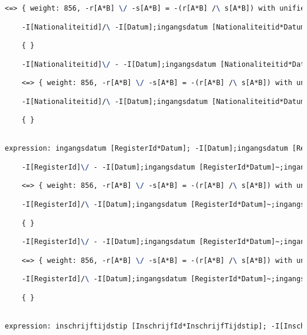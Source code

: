 \begin{lstlisting}[language=TeX]
    <=> { weight: 856, -r[A*B] \/ -s[A*B] = -(r[A*B] /\ s[A*B]) with unifier: {A->I[Nationaliteitid], B->I[Nationaliteitid], r->ingangsdatum [Nationaliteitid*Datum];-I[Datum];ingangsdatum [Nationaliteitid*Datum]~, s->I[Nationaliteitid]} }

    -I[Nationaliteitid]/\ -I[Datum];ingangsdatum [Nationaliteitid*Datum]~;ingangsdatum [Nationaliteitid*Datum]

    { }

    -I[Nationaliteitid]\/ - -I[Datum];ingangsdatum [Nationaliteitid*Datum]~;ingangsdatum [Nationaliteitid*Datum]

    <=> { weight: 856, -r[A*B] \/ -s[A*B] = -(r[A*B] /\ s[A*B]) with unifier: {A->I[Nationaliteitid], B->I[Nationaliteitid], r->I[Nationaliteitid], s->ingangsdatum [Nationaliteitid*Datum];-I[Datum];ingangsdatum [Nationaliteitid*Datum]~} }

    -I[Nationaliteitid]/\ -I[Datum];ingangsdatum [Nationaliteitid*Datum]~;ingangsdatum [Nationaliteitid*Datum]

    { }


expression: ingangsdatum [RegisterId*Datum]; -I[Datum];ingangsdatum [RegisterId*Datum]~ |- -I[RegisterId]

    -I[RegisterId]\/ - -I[Datum];ingangsdatum [RegisterId*Datum]~;ingangsdatum [RegisterId*Datum]

    <=> { weight: 856, -r[A*B] \/ -s[A*B] = -(r[A*B] /\ s[A*B]) with unifier: {A->I[RegisterId], B->I[RegisterId], r->ingangsdatum [RegisterId*Datum];-I[Datum];ingangsdatum [RegisterId*Datum]~, s->I[RegisterId]} }

    -I[RegisterId]/\ -I[Datum];ingangsdatum [RegisterId*Datum]~;ingangsdatum [RegisterId*Datum]

    { }

    -I[RegisterId]\/ - -I[Datum];ingangsdatum [RegisterId*Datum]~;ingangsdatum [RegisterId*Datum]

    <=> { weight: 856, -r[A*B] \/ -s[A*B] = -(r[A*B] /\ s[A*B]) with unifier: {A->I[RegisterId], B->I[RegisterId], r->I[RegisterId], s->ingangsdatum [RegisterId*Datum];-I[Datum];ingangsdatum [RegisterId*Datum]~} }

    -I[RegisterId]/\ -I[Datum];ingangsdatum [RegisterId*Datum]~;ingangsdatum [RegisterId*Datum]

    { }


expression: inschrijftijdstip [InschrijfId*InschrijfTijdstip]; -I[InschrijfTijdstip];inschrijftijdstip [InschrijfId*InschrijfTijdstip]~ |- -I[InschrijfId]


\end{lstlisting}
